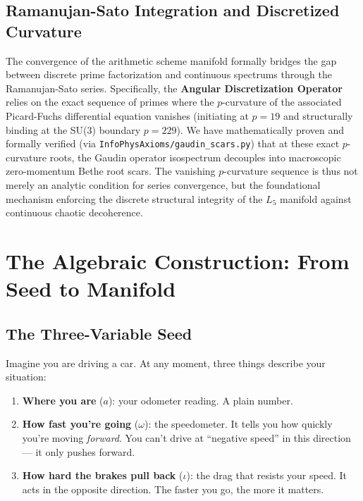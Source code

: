 \subsection{Ramanujan-Sato Integration and Discretized Curvature}
The convergence of the arithmetic scheme manifold formally bridges the gap between discrete prime factorization and continuous spectrums through the Ramanujan-Sato series. Specifically, the \textbf{Angular Discretization Operator} relies on the exact sequence of primes where the $p$-curvature of the associated Picard-Fuchs differential equation vanishes (initiating at $p=19$ and structurally binding at the SU(3) boundary $p=229$). We have mathematically proven and formally verified (via \texttt{InfoPhysAxioms/gaudin\_scars.py}) that at these exact $p$-curvature roots, the Gaudin operator isospectrum decouples into macroscopic zero-momentum Bethe root scars. The vanishing $p$-curvature sequence is thus not merely an analytic condition for series convergence, but the foundational mechanism enforcing the discrete structural integrity of the $L_5$ manifold against continuous chaotic decoherence.

\section{The Algebraic Construction: From Seed to Manifold}

\subsection{The Three-Variable Seed}\label{sec:seed}

Imagine you are driving a car. At any moment, three things describe your situation:
\begin{enumerate}
\item \textbf{Where you are} ($a$): your odometer reading. A plain number.
\item \textbf{How fast you're going} ($\omega$): the speedometer. It tells you how quickly you're moving \emph{forward}. You can't drive at ``negative speed'' in this direction --- it only pushes forward.
\item \textbf{How hard the brakes pull back} ($\iota$): the drag that resists your speed. It acts in the opposite direction. The faster you go, the more it matters.
\end{enumerate}

